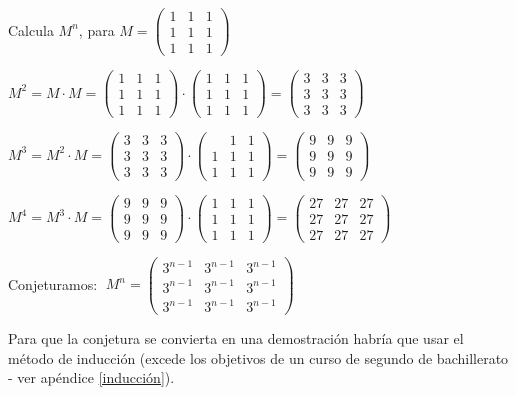 \begin{ejre}
 Calcula $M^n$, para $M=\left( \begin{matrix} 1&1&1\\1&1&1\\1&1&1 \end{matrix} \right)$
\end{ejre}
\begin{proofw}\renewcommand{\qedsymbol}{$\diamond$}

\noindent $M^2=M\cdot M=\left( \begin{matrix}1 &1&1\\1&1&1\\1&1&1 \end{matrix} \right)\cdot \left( \begin{matrix} 1&1&1\\1&1&1\\1&1&1 \end{matrix} \right)=\left( \begin{matrix} 3&3&3\\3&3&3\\3&3&3 \end{matrix} \right)$

\noindent $M^3=M^2 \cdot M=\left( \begin{matrix} 3&3&3\\3&3&3\\3&3&3 \end{matrix} \right)\cdot \left( \begin{matrix} &1&1\\1&1&1\\1&1&1 \end{matrix} \right)=\left( \begin{matrix} 9&9&9\\9&9&9\\9&9&9 \end{matrix} \right)$

\noindent $M^4=M^3\cdot M=\left( \begin{matrix} 9&9&9\\9&9&9\\9&9&9 \end{matrix} \right)\cdot \left( \begin{matrix} 1&1&1\\1&1&1\\1&1&1 \end{matrix} \right)=\left( \begin{matrix} 27&27&27\\27&27&27\\27&27&27 \end{matrix} \right)$

Conjeturamos: $\; M^n=\left( \begin{matrix} 3^{n-1}&3^{n-1}&3^{n-1}\\3^{n-1}&3^{n-1}&3^{n-1}\\3^{n-1}&3^{n-1}&3^{n-1} \end{matrix} \right)$

Para que la conjetura se convierta en una demostración habría que usar el método de inducción (excede los objetivos de un curso de segundo de bachillerato - ver apéndice \ref{inducción}).
\end{proofw}



